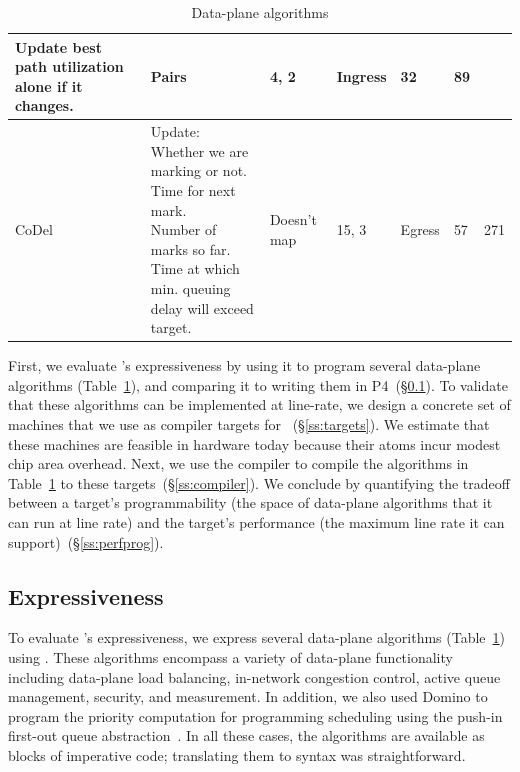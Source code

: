 \begin{table}[!t]
\begin{tabular}{|p{}|p{}|p{}|p{}|p{}|p{}|p{}|}
{                                           Update best path utilization alone if it changes.}  & Pairs & 4, 2 & Ingress & 32 & 89\\
\hline
CoDel~\cite{codel} & \pbox{0.37\textwidth}{Update:\\Whether we are marking or not.\\Time for next mark.\\Number of marks so far.\\Time at which min. queuing delay will exceed target.}& Doesn't map & 15, 3 & Egress & 57 & 271\\
\hline
\end{tabular}
\caption{Data-plane algorithms}
\label{tab:algos}
\end{table}

First, we evaluate \pktlanguage's expressiveness by using it to program several
data-plane algorithms (Table~\ref{tab:algos}), and comparing it to writing them
in P4~(\S\ref{ss:expressiveness}).  To validate that these algorithms can be
implemented at line-rate, we design a concrete set of \absmachine machines that
we use as compiler targets for \pktlanguage~(\S\ref{ss:targets}).  We estimate
that these machines are feasible in hardware today because their atoms incur
modest chip area overhead. Next, we use the \pktlanguage compiler to compile
the algorithms in Table~\ref{tab:algos} to these targets~(\S\ref{ss:compiler}).
We conclude by quantifying the tradeoff between a target's programmability (the
space of data-plane algorithms that it can run at line rate) and the target's
performance (the maximum line rate it can support)~(\S\ref{ss:perfprog}).

\subsection{Expressiveness}
\label{ss:expressiveness}

To evaluate \pktlanguage's expressiveness, we express several data-plane
algorithms (Table~\ref{tab:algos}) using \pktlanguage. These algorithms
encompass a variety of data-plane functionality including data-plane load
balancing, in-network congestion control, active queue management, security,
and measurement. In addition, we also used Domino to program the priority
computation for programming scheduling using the push-in first-out queue
abstraction~\cite{pifo_hotnets}. In all these cases, the algorithms are
available as blocks of imperative code; translating them to \pktlanguage syntax
was straightforward.

